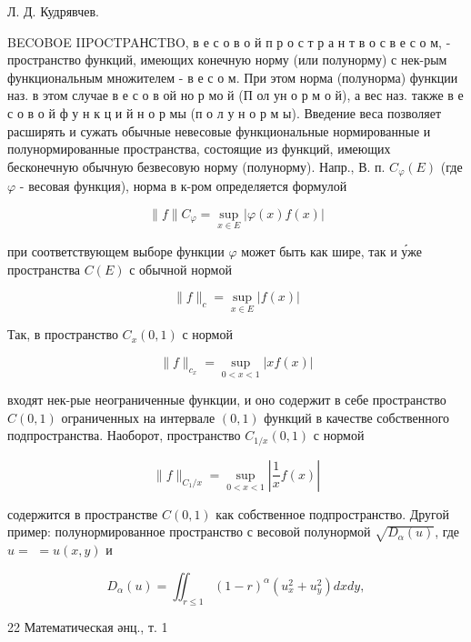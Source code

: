 \documentclass[10pt]{article}
\begin{document}
Л. Д. Кудрявчев.



BECOBOE IIPOCTPAНСTBO, в е с о в о й п р о с т р а н т в о с в е с о м, - пространство функций, имеющих конечную норму (или полунорму) с нек-рым функциональным множителем - в е с о м. При этом норма (полунорма) функции наз. в этом случае в е с о в ой но р мо й (П ол ун о р м о й), а вес наз. также в е с о в о й ф у н к ц и й н о р мы (п о л у н о р м ы). Введение веса позволяет расширять и сужать обычные невесовые функциональные нормированные и полунормированные пространства, состоящие из функций, имеющих бесконечную обычную безвесовую норму (полунорму). Напр., В. п. $C_{\varphi}(E)$ (где $\varphi$ - весовая функция), норма в к-ром определяется формулой



\[

\|f\| C_{\varphi}=\sup _{x \in E}|\varphi(x) f(x)|

\]



при соответствующем выборе функции $\varphi$ может быть как шире, так и у́же пространства $C(E)$ с обычной нормой



\[

\|f\|_{c}=\sup _{x \in E}|f(x)|

\]



Так, в пространство $C_{x}(0,1)$ с нормой



\[

\|f\|_{c_{x}}=\sup _{0<x<1}|x f(x)|

\]



входят нек-рые неограниченные функции, и оно содержит в себе пространство $C(0,1)$ ограниченных на интервале $(0,1)$ функций в качестве собственного подпространства. Наоборот, пространство $C_{1 / x}(0,1)$ с нормой



\[

\|f\|_{C_{1} / x}=\sup _{0<x<1}\left|\frac{1}{x} f(x)\right|

\]



содержится в пространстве $C(0,1)$ как собственное подпространство. Другой пример: полунормированное пространство с весовой полунормой $\sqrt{D_{\alpha}(u)}$, где $u=$ $=u(x, y)$ и



\[

D_{\alpha}(u)=\iint_{r \leqslant 1}(1-r)^{\alpha}\left(u_{x}^{2}+u_{y}^{2}\right) d x d y,

\]



22 Математическая әнц., т. 1
\end{document}
